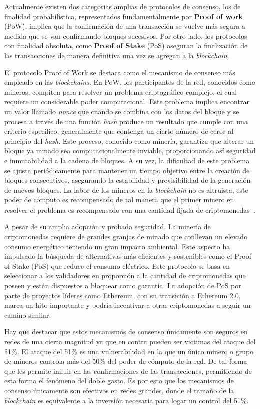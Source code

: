 Actualmente existen dos categorías amplias de protocolos de consenso, los de finalidad probabilística, representados fundamentalmente por \textbf{Proof of work} (PoW), implica que la confirmación de una transacción se vuelve más segura a medida que se van confirmando bloques sucesivos.
Por otro lado, los protocolos con finalidad absoluta, como \textbf{Proof of Stake} (PoS) aseguran la finalización de las transacciones de manera definitiva una vez se agregan a la \textit{blockchain}.

El protocolo Proof of Work se destaca como el mecanismo de consenso más empleado en las \textit{blockchains}. En PoW, los participantes de la red, conocidos como mineros, compiten para resolver un problema criptográfico complejo, el cual requiere un considerable poder computacional. Este problema implica encontrar un valor llamado \textit{nonce} que cuando se combina con los datos del bloque y se procesa a través de una función \textit{hash} produce un resultado que cumple con una criterio especifico, generalmente que contenga un cierto número de ceros al principio del \textit{hash}.
Este proceso, conocido como minería, garantiza que alterar un bloque ya minado sea computacionalmente inviable, proporcionando así seguridad e inmutabilidad a la cadena de bloques. A su vez, la dificultad de este problema se ajusta periódicamente para mantener un tiempo objetivo entre la creación de bloques consecutivos, asegurando la estabilidad y previsibilidad de la generación de nuevos bloques.
La labor de los mineros en la \textit{blockchain} no es altruista, este poder de cómputo es recompensado de tal manera que el primer minero en resolver el problema es recompensado con una cantidad fijada de criptomonedas~\cite{PoW}.

A pesar de su amplia adopción y probada seguridad, La minería de criptomonedas requiere de grandes granjas de minado que conllevan un elevado consumo energético teniendo un gran impacto ambiental. 
Este aspecto ha impulsado la búsqueda de alternativas más eficientes y sostenibles como el Proof of Stake (PoS) que reduce el consumo eléctrico. Este protocolo se basa en seleccionar a los validadores en proporción a la cantidad de criptomonedas que poseen y están dispuestos a bloquear como garantía.
La adopción de PoS por parte de proyectos líderes como Ethereum, con su transición a Ethereum 2.0, marca un hito importante y podría incentivar a otras criptomonedas a seguir un camino similar.

Hay que destacar que estos mecanismos de consenso únicamente son seguros en redes de una cierta magnitud ya que en contra pueden ser victimas del ataque del 51\%.
El ataque del 51\% es una vulnerabilidad en la que un único minero o grupo de mineros controla más del 50\% del poder de cómputo de la red. De tal forma que les permite influir en las confirmaciones de las transacciones, permitiendo de esta forma el fenómeno del doble gasto.
Es por esto que los mecanismos de consenso únicamente son efectivos en redes grandes, donde el tamaño de la \textit{blockchain} es equivalente a la inversión necesaria para logar un control del 51\%.




